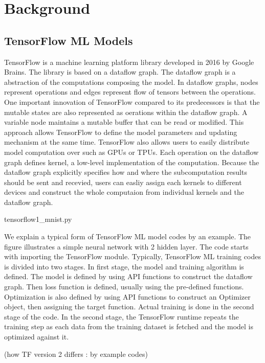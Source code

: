\section{Background}\label{sec:background}
\subsection{TensorFlow ML Models}

TensorFlow\cite{tensorflow} is a machine learning platform library
developed in 2016 by Google Brains.
The library is based on a dataflow graph.
The dataflow graph is a abstraction of the computations
composing the model.
In dataflow graphs, nodes represent operations and
edges represent flow of tensors between the operations.
One important innovation of TensorFlow compared to its predecessors
is that the mutable states are also represented as oerations
within the dataflow graph. 
A variable node maintains a mutable buffer that can be read or modified.
This approach allows TensorFlow to define the model parameters
and updating mechanism at the same time.
TensorFlow also allows users to easily distribute model computation over
such as GPUs or TPUs.
Each operation on the dataflow graph defines kernel,
a low-level implementation of the computation.
Because the dataflow graph explicitly specifies how
and where the subcomputation results should be sent and recevied,
users can easliy assign each kernels to different devices and construct
the whole computaion from individual kernels and the dataflow graph.


{tensorflow1_mnist.py}

We explain a typical form of TensorFlow ML model codes by an example.
The figure illustrates a simple neural network with 2 hidden layer.
The code starts with importing the TensorFlow module.
Typically, TensorFlow ML training codes is divided into two stages.
In first stage, the model and training algorithm is defined.
The model is defined by using API functions to construct the dataflow graph.
Then loss function is defined, usually using the pre-defined functions.
Optimization is also defined by using API functions to construct
an Optimizer object, then assigning the target function.
Actual training is done in the second stage of the code.
In the second stage, the TensorFlow runtime repeats the training step
as each data from the training dataset is fetched and
the model is optimized against it.

(how TF version 2 differs : by example codes)

